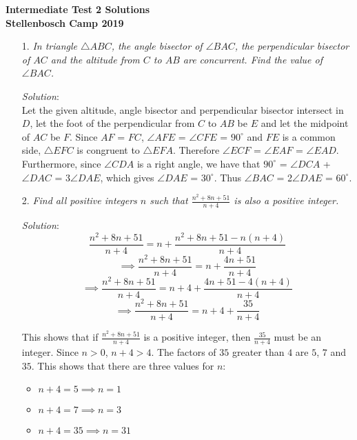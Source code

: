 \documentclass{article}
\begin{document}
\begin{center}
  \textbf{\Large Intermediate Test 2 Solutions}
  \\ \vspace{1em}
  \textbf{\large Stellenbosch Camp 2019}
\end{center}


\begin{enumerate}[1.]

\item[1.] %
\textit{In triangle $\triangle ABC$, the angle bisector of $\angle BAC$, the perpendicular bisector of $AC$ and the altitude from $C$ to $AB$ are concurrent. Find the value of $\angle BAC$.}

\textit{Solution}:
\\
Let the given altitude, angle bisector and perpendicular bisector intersect in $D$, let the foot of the perpendicular from $C$ to $AB$ be $E$ and let the midpoint of $AC$ be $F$. Since $AF$ = $FC$, $\angle AFE$ = $\angle CFE$ = $90^{\circ}$
and $FE$ is a common side, $\triangle EFC$ is congruent to $\triangle EFA$. Therefore $\angle ECF$ = $\angle EAF $ = $\angle EAD$. Furthermore, since $\angle CDA$ is a right angle, we have that $90^{\circ}$ =  $\angle DCA$ + $\angle DAC$ = 3$\angle DAE$, which gives $\angle DAE$ = $30^{\circ}$. Thus $\angle BAC$ = 2$\angle DAE$ = $60^{\circ}$.
\vspace{6.81mm}

\item[2.] %
\textit{Find all positive integers $n$ such that $\frac{n^2 + 8n + 51}{n + 4}$ is also a positive integer.}

\textit{Solution}:
$$\frac{n^2 + 8n + 51}{n + 4} = n + \frac{n^2 + 8n + 51 - n(n + 4)}{n + 4}$$
$$\implies \frac{n^2 + 8n + 51}{n + 4} = n + \frac{4n + 51}{n + 4}$$
$$\implies \frac{n^2 + 8n + 51}{n + 4} = n + 4 + \frac{4n + 51 - 4(n + 4)}{n + 4}$$
$$\implies \frac{n^2 + 8n + 51}{n + 4} = n + 4 + \frac{35}{n + 4}$$

This shows that if $\frac{n^2 + 8n + 51}{n + 4}$ is a positive integer, then $\frac{35}{n + 4}$ must be an integer. Since $n > 0$, $n + 4 > 4$.
The factors of $35$ greater than $4$ are $5$, $7$ and $35$. This shows that there are three values for $n$:
\begin{itemize}
    \item $n + 4 = 5 \implies n = 1$
    \item $n + 4 = 7 \implies n = 3$
    \item $n + 4 = 35 \implies n = 31$
\end{itemize}


\end{enumerate}
\end{document}
